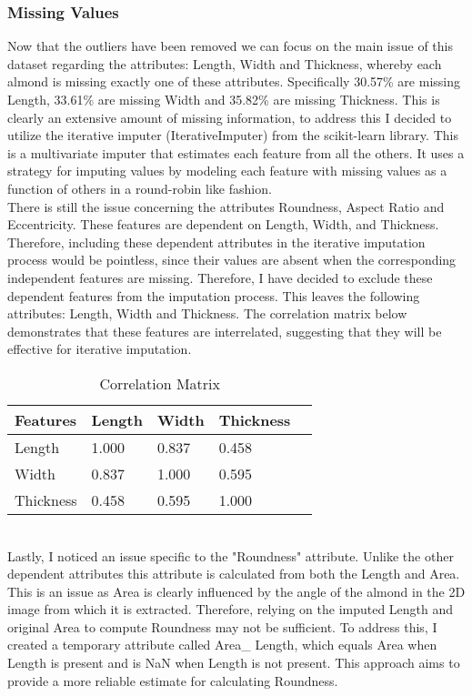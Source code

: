 \documentclass[conference]{IEEEtran}
\begin{document}
\subsubsection{Missing Values}
Now that the outliers have been removed we can focus on the main issue of this dataset regarding the attributes: Length, Width and Thickness, whereby each almond is missing exactly one of these attributes. Specifically 30.57\% are missing Length, 33.61\% are missing Width and 35.82\% are missing Thickness. This is clearly an extensive amount of missing information, to address this I decided to utilize the iterative imputer (IterativeImputer) from the scikit-learn library. This is a multivariate imputer that estimates each feature from all the others. It uses a strategy for imputing values by modeling each feature with missing values as a function of others in a round-robin like fashion.
\newline \\
There is still the issue concerning the attributes Roundness, Aspect Ratio and Eccentricity. These features are dependent on Length, Width, and Thickness. Therefore, including these dependent attributes in the iterative imputation process would be pointless, since their values are absent when the corresponding independent features are missing. Therefore, I have decided to exclude these dependent features from the imputation process. This leaves the following attributes: Length, Width and Thickness. The correlation matrix below demonstrates that these features are interrelated, suggesting that they will be effective for iterative imputation.
\begin{table}[h]
    \centering
    \caption{Correlation Matrix}
    \small
    \begin{tabular}{|p{1.5cm}|p{1cm}|p{1cm}|p{1.5cm}|p{1cm}|}
        \hline
        \textbf{Features} & \textbf{Length} & \textbf{Width} & \textbf{Thickness} \\
        \hline
        Length    & 1.000 & 0.837 & 0.458\\
        \hline
        Width     & 0.837 & 1.000 & 0.595\\
        \hline
        Thickness & 0.458 & 0.595 & 1.000\\
        \hline
    \end{tabular}
    \label{tab:correlation_matrix}
\end{table}
\newline \\
Lastly, I noticed an issue specific to the "Roundness" attribute. Unlike the other dependent attributes this attribute is calculated from both the Length and Area. This is an issue as Area is clearly influenced by the angle of the almond in the 2D image from which it is extracted. Therefore, relying on the imputed Length and original Area to compute Roundness may not be sufficient. To address this, I created a temporary attribute called Area\_ Length, which equals Area when Length is present and is NaN when Length is not present. This approach aims to provide a more reliable estimate for calculating Roundness.
\end{document}
